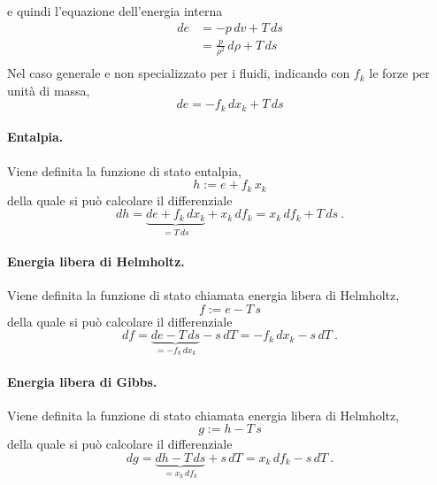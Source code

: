e quindi l'equazione dell'energia interna
\begin{equation}
\begin{aligned}
    de & = - p \, dv + T \, ds \\
       & = \frac{p}{\rho^2} \, d\rho + T \, ds \\
\end{aligned}
\end{equation}
Nel caso generale e non specializzato per i fluidi, indicando con $f_k$ le forze per unità di massa,
\begin{equation}
    de = - f_k \, d x_k + T \, ds
\end{equation}

\paragraph{Entalpia.} Viene definita la funzione di stato entalpia,
\begin{equation}
    h := e + f_k \, x_k
\end{equation}
della quale si può calcolare il differenziale
\begin{equation}
    dh = \underbrace{de + f_k \, dx_k}_{ = T \, ds} + x_k \, df_k = x_k \, df_k + T \, ds \ .
\end{equation}

\paragraph{Energia libera di Helmholtz.} Viene definita la funzione di stato chiamata energia libera di Helmholtz,
\begin{equation}
    f := e - T \, s
\end{equation}
della quale si può calcolare il differenziale
\begin{equation}
    df = \underbrace{de - T \, ds}_{= - f_k \, d x_k } - s \, dT = - f_k \, d x_k - s \, dT \ .
\end{equation}

\paragraph{Energia libera di Gibbs.} Viene definita la funzione di stato chiamata energia libera di Helmholtz,
\begin{equation}
    g := h - T \, s
\end{equation}
della quale si può calcolare il differenziale
\begin{equation}
    dg = \underbrace{dh - T \, ds}_{= x_k \, d f_k } + s \, dT = x_k \, d f_k - s \, dT \ .
\end{equation}

